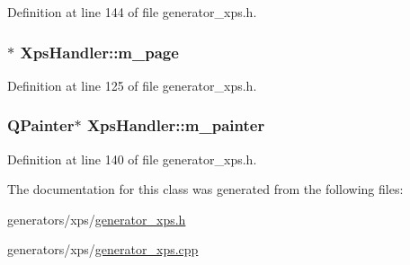 Definition at line 144 of file generator\+\_\+xps.\+h.

\hypertarget{classXpsHandler_a57252ea44adece639b38d84237222d7f}{
\subsubsection[{m\+\_\+page}]{$\ast$ Xps\+Handler\+::m\+\_\+page\hspace{0.3cm}{\ttfamily [protected]}}}\label{classXpsHandler_a57252ea44adece639b38d84237222d7f}


Definition at line 125 of file generator\+\_\+xps.\+h.

\hypertarget{classXpsHandler_a2db77df5312274e6f1d7e274b45c9d21}{
\subsubsection[{m\+\_\+painter}]{\setlength{\rightskip}{0pt plus 5cm}Q\+Painter$\ast$ Xps\+Handler\+::m\+\_\+painter\hspace{0.3cm}{\ttfamily [protected]}}}\label{classXpsHandler_a2db77df5312274e6f1d7e274b45c9d21}


Definition at line 140 of file generator\+\_\+xps.\+h.



The documentation for this class was generated from the following files\+:\begin{DoxyCompactItemize}
\item 
generators/xps/\hyperlink{generator__xps_8h}{generator\+\_\+xps.\+h}\item 
generators/xps/\hyperlink{generator__xps_8cpp}{generator\+\_\+xps.\+cpp}\end{DoxyCompactItemize}
